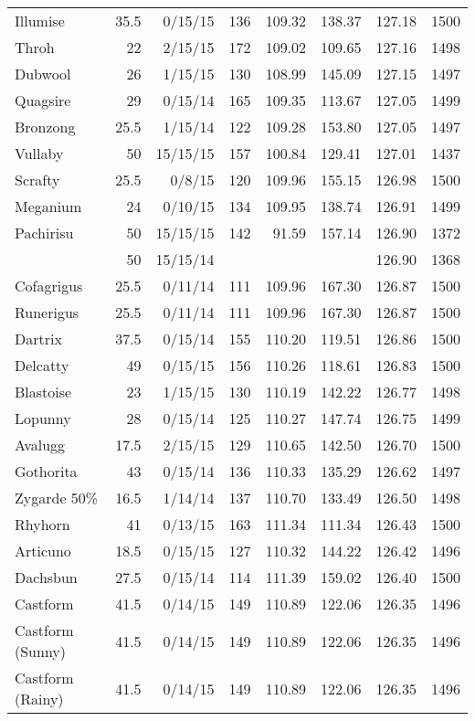 \begin{longtable}{lrrrrrrr}
Illumise & 35.5 & 0/15/15 & 136 & 109.32 & 138.37 & 127.18 & 1500\\
Throh & 22 & 2/15/15 & 172 & 109.02 & 109.65 & 127.16 & 1498\\
Dubwool & 26 & 1/15/15 & 130 & 108.99 & 145.09 & 127.15 & 1497\\
Quagsire & 29 & 0/15/14 & 165 & 109.35 & 113.67 & 127.05 & 1499\\
Bronzong & 25.5 & 1/15/14 & 122 & 109.28 & 153.80 & 127.05 & 1497\\
Vullaby & 50 & 15/15/15 & 157 & 100.84 & 129.41 & 127.01 & 1437\\
Scrafty & 25.5 & 0/8/15 & 120 & 109.96 & 155.15 & 126.98 & 1500\\
Meganium & 24 & 0/10/15 & 134 & 109.95 & 138.74 & 126.91 & 1499\\
Pachirisu & 50 & 15/15/15 & 142 & 91.59 & 157.14 & 126.90 & 1372\\
 & 50 & 15/15/14 & & & & 126.90 & 1368\\
Cofagrigus & 25.5 & 0/11/14 & 111 & 109.96 & 167.30 & 126.87 & 1500\\
Runerigus & 25.5 & 0/11/14 & 111 & 109.96 & 167.30 & 126.87 & 1500\\
Dartrix & 37.5 & 0/15/14 & 155 & 110.20 & 119.51 & 126.86 & 1500\\
Delcatty & 49 & 0/15/15 & 156 & 110.26 & 118.61 & 126.83 & 1500\\
Blastoise & 23 & 1/15/15 & 130 & 110.19 & 142.22 & 126.77 & 1498\\
Lopunny & 28 & 0/15/14 & 125 & 110.27 & 147.74 & 126.75 & 1499\\
Avalugg & 17.5 & 2/15/15 & 129 & 110.65 & 142.50 & 126.70 & 1500\\
Gothorita & 43 & 0/15/14 & 136 & 110.33 & 135.29 & 126.62 & 1497\\
Zygarde 50\% & 16.5 & 1/14/14 & 137 & 110.70 & 133.49 & 126.50 & 1498\\
Rhyhorn & 41 & 0/13/15 & 163 & 111.34 & 111.34 & 126.43 & 1500\\
Articuno & 18.5 & 0/15/15 & 127 & 110.32 & 144.22 & 126.42 & 1496\\
Dachsbun & 27.5 & 0/15/14 & 114 & 111.39 & 159.02 & 126.40 & 1500\\
Castform & 41.5 & 0/14/15 & 149 & 110.89 & 122.06 & 126.35 & 1496\\
Castform (Sunny) & 41.5 & 0/14/15 & 149 & 110.89 & 122.06 & 126.35 & 1496\\
Castform (Rainy) & 41.5 & 0/14/15 & 149 & 110.89 & 122.06 & 126.35 & 1496\\

\end{longtable}
